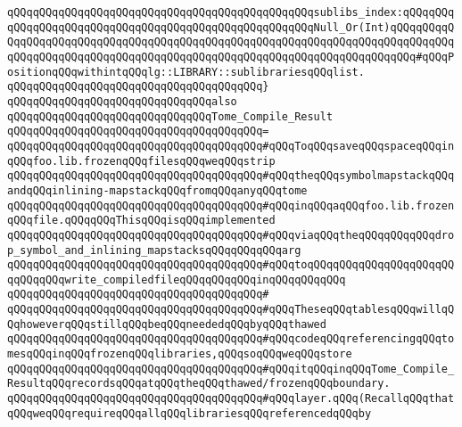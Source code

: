 \verb|qQQqqQQqqQQqqQQqqQQqqQQqqQQqqQQqqQQqqQQqqQQqqQQqsublibs_index:qQQqqQQqqQQqqQQqqQQqqQQqqQQqqQQqqQQqqQQqqQQqqQQqqQQqqQQqNull_Or(Int)qQQqqQQqqQQqqQQqqQQqqQQqqQQqqQQqqQQqqQQqqQQqqQQqqQQqqQQqqQQqqQQqqQQqqQQqqQQqqQQqqQQqqQQqqQQqqQQqqQQqqQQqqQQqqQQqqQQqqQQqqQQqqQQqqQQqqQQqqQQqqQQq#qQQqPositionqQQqwithintqQQqlg::LIBRARY::sublibrariesqQQqlist.|\newline
\verb|qQQqqQQqqQQqqQQqqQQqqQQqqQQqqQQqqQQqqQQq}|\newline
\newline
\verb|qQQqqQQqqQQqqQQqqQQqqQQqqQQqqQQqalso|\newline
\verb|qQQqqQQqqQQqqQQqqQQqqQQqqQQqqQQqTome_Compile_Result|\newline
\verb|qQQqqQQqqQQqqQQqqQQqqQQqqQQqqQQqqQQqqQQq=|\newline
\verb|qQQqqQQqqQQqqQQqqQQqqQQqqQQqqQQqqQQqqQQq#qQQqToqQQqsaveqQQqspaceqQQqinqQQqfoo.lib.frozenqQQqfilesqQQqweqQQqstrip|\newline
\verb|qQQqqQQqqQQqqQQqqQQqqQQqqQQqqQQqqQQqqQQq#qQQqtheqQQqsymbolmapstackqQQqandqQQqinlining-mapstackqQQqfromqQQqanyqQQqtome|\newline
\verb|qQQqqQQqqQQqqQQqqQQqqQQqqQQqqQQqqQQqqQQq#qQQqinqQQqaqQQqfoo.lib.frozenqQQqfile.qQQqqQQqThisqQQqisqQQqimplemented|\newline
\verb|qQQqqQQqqQQqqQQqqQQqqQQqqQQqqQQqqQQqqQQq#qQQqviaqQQqtheqQQqqQQqqQQqdrop_symbol_and_inlining_mapstacksqQQqqQQqqQQqarg|\newline
\verb|qQQqqQQqqQQqqQQqqQQqqQQqqQQqqQQqqQQqqQQq#qQQqtoqQQqqQQqqQQqqQQqqQQqqQQqqQQqqQQqwrite_compiledfileqQQqqQQqqQQqinqQQqqQQqqQQq|\newline
\verb|qQQqqQQqqQQqqQQqqQQqqQQqqQQqqQQqqQQqqQQq#|\newline
\verb|qQQqqQQqqQQqqQQqqQQqqQQqqQQqqQQqqQQqqQQq#qQQqTheseqQQqtablesqQQqwillqQQqhoweverqQQqstillqQQqbeqQQqneededqQQqbyqQQqthawed|\newline
\verb|qQQqqQQqqQQqqQQqqQQqqQQqqQQqqQQqqQQqqQQq#qQQqcodeqQQqreferencingqQQqtomesqQQqinqQQqfrozenqQQqlibraries,qQQqsoqQQqweqQQqstore|\newline
\verb|qQQqqQQqqQQqqQQqqQQqqQQqqQQqqQQqqQQqqQQq#qQQqitqQQqinqQQqTome_Compile_ResultqQQqrecordsqQQqatqQQqtheqQQqthawed/frozenqQQqboundary.|\newline
\verb|qQQqqQQqqQQqqQQqqQQqqQQqqQQqqQQqqQQqqQQq#qQQqlayer.qQQq(RecallqQQqthatqQQqweqQQqrequireqQQqallqQQqlibrariesqQQqreferencedqQQqby|\newline
